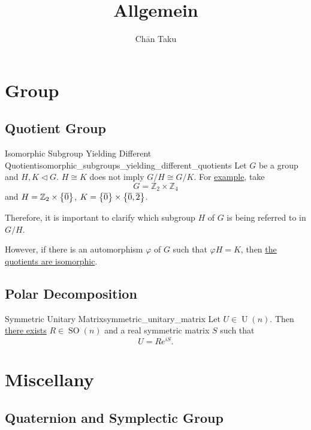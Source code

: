 \documentclass{article}
\title{Allgemein}
\author{Ch\=an Taku}
\begin{document}
\maketitle

\section{Group}

\subsection{Quotient Group}

\begin{counterexample}{Isomorphic Subgroup Yielding Different Quotient}{isomorphic_subgroups_yielding_different_quotients}
    Let $G$ be a group and $H,K\vartriangleleft G$.
    $H\cong K$ does not imply $G/H \cong G/K$.
    For \href{https://math.stackexchange.com/questions/40763/isomorphic-quotient-groups/}{example}, take
    \[ G = \mathbb{Z}_2 \times \mathbb{Z}_4 \]
    and $H = \mathbb{Z}_2 \times \qty{\overline{0}}$, $K = \qty{\overline{0}} \times \qty{\overline{0}, \overline{2}}$.
\end{counterexample}

Therefore, it is important to clarify which subgroup $H$ of $G$ is being referred to in $G/H$.
\par
However, if there is an automorphism $\varphi$ of $G$ such that $\varphi{H} = K$, then \href{https://math.stackexchange.com/questions/40881/isomorphic-quotients-by-isomorphic-normal-subgroups}{the quotients are isomorphic}.

\subsection{Polar Decomposition}

\begin{theorem}{Symmetric Unitary Matrix}{symmetric_unitary_matrix}
    Let $U\in \operatorname{U}(n)$. Then \href{https://mathoverflow.net/questions/93774/symmetric-unitary-matrices}{there exists} $R\in\operatorname{SO}(n)$ and a real symmetric matrix $S$ such that 
    \[ U = R e^{iS}. \]
\end{theorem}

\section{Miscellany}

\subsection{Quaternion and Symplectic Group}
\end{document}
